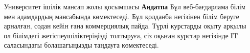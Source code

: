 \newpage
\pagestyle{plain}

{
\begin{center}
    \Large
    Университет ішілік мансап жолы қосымшасы
    \textbf{Аңдатпа}
Бұл веб-бағдарлама білім мен адамдардың мансабында көмектеседі. Бұл қолданба негізінен білім беруге арналған, содан кейін ғана коммерциялық пайда. Түрлі курстарды оқыту арқылы ол білімдегі жетіспеушіліктеріңізді толтыруға, сіз оқыған курстар негізінде IT саласындағы болашағыңызды таңдауға көмектеседі.
\end{center}
}
